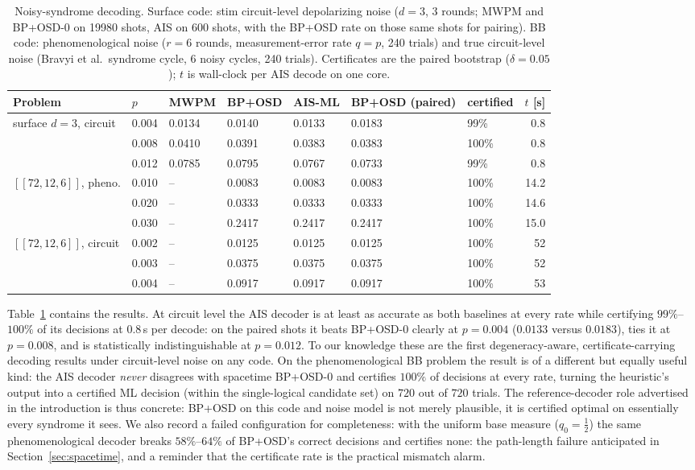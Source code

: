 \documentclass[a4paper,11pt]{quantumarticle}
\theoremstyle{definition}
\begin{document}
\begin{table}[t]
\centering
\caption{Noisy-syndrome decoding. Surface code: stim circuit-level
depolarizing noise ($d=3$, $3$ rounds; MWPM and BP+OSD-0 on
19980 shots, AIS on 600 shots, with the BP+OSD rate on those same shots for pairing).
BB code: phenomenological noise ($r=6$ rounds, measurement-error
rate $q=p$, 240 trials) and true
circuit-level noise (Bravyi et al.\ syndrome cycle, $6$ noisy
cycles, 240 trials). Certificates are the paired bootstrap
($\delta=0.05$); $t$ is wall-clock per AIS decode on one core.}
\label{tab:exp4}
\begin{tabular}{@{}lllllllr@{}}
\toprule
Problem & $p$ & MWPM & BP+OSD & AIS-ML & BP+OSD (paired) & certified & $t$ [s] \\
\midrule
surface $d{=}3$, circuit & 0.004 & 0.0134 & 0.0140 & 0.0133 & 0.0183 & 99\% & 0.8 \\
 & 0.008 & 0.0410 & 0.0391 & 0.0383 & 0.0383 & 100\% & 0.8 \\
 & 0.012 & 0.0785 & 0.0795 & 0.0767 & 0.0733 & 99\% & 0.8 \\
\midrule
$[\![72,12,6]\!]$, pheno. & 0.010 & -- & 0.0083 & 0.0083 & 0.0083 & 100\% & 14.2 \\
 & 0.020 & -- & 0.0333 & 0.0333 & 0.0333 & 100\% & 14.6 \\
 & 0.030 & -- & 0.2417 & 0.2417 & 0.2417 & 100\% & 15.0 \\
\midrule
$[\![72,12,6]\!]$, circuit & 0.002 & -- & 0.0125 & 0.0125 & 0.0125 & 100\% & 52 \\
 & 0.003 & -- & 0.0375 & 0.0375 & 0.0375 & 100\% & 52 \\
 & 0.004 & -- & 0.0917 & 0.0917 & 0.0917 & 100\% & 53 \\
\bottomrule
\end{tabular}
\end{table}


Table~\ref{tab:exp4} contains the results. At circuit level the AIS
decoder is at least as accurate as both baselines at every rate while
certifying $99\%$--$100\%$ of its decisions at $0.8$\,s per decode: on the
paired shots it beats BP+OSD-0 clearly at $p=0.004$ ($0.0133$ versus
$0.0183$), ties it at $p=0.008$, and is statistically indistinguishable at
$p=0.012$. To our knowledge these are the first
degeneracy-aware, certificate-carrying decoding results under
circuit-level noise on any code. On the phenomenological BB problem the
result is of a different but equally useful kind: the AIS decoder
\emph{never} disagrees with spacetime BP+OSD-0 and certifies $100\%$ of
decisions at every rate, turning the heuristic's output into a certified
ML decision (within the single-logical candidate set) on $720$ out of
$720$ trials. The reference-decoder role advertised in the introduction is
thus concrete: BP+OSD on this code and noise model is not merely
plausible, it is certified optimal on essentially every syndrome it
sees. We also record a failed configuration for completeness: with the
uniform base measure ($q_0=\tfrac12$) the same phenomenological decoder
breaks $58\%$--$64\%$ of BP+OSD's correct decisions and certifies
none: the path-length failure anticipated in
Section~\ref{sec:spacetime}, and a reminder that the certificate rate is
the practical mismatch alarm.
\end{document}
